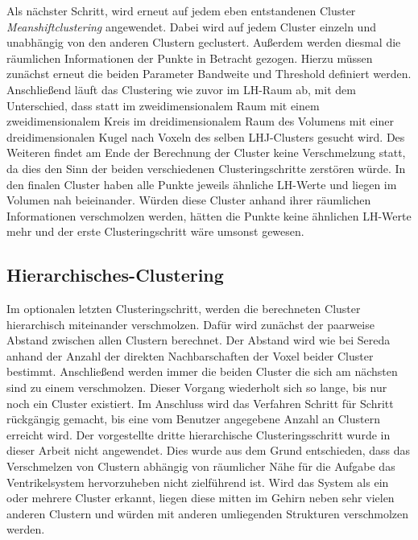 Als nächster Schritt, wird erneut auf jedem eben entstandenen Cluster \textit{Meanshiftclustering} angewendet. Dabei wird auf jedem Cluster einzeln und unabhängig von den anderen Clustern geclustert. Außerdem werden diesmal die räumlichen Informationen der Punkte in Betracht gezogen. Hierzu müssen zunächst erneut die beiden Parameter Bandweite und Threshold definiert werden.
\newline
Anschließend läuft das Clustering wie zuvor im LH-Raum ab, mit dem Unterschied, dass statt im zweidimensionalem Raum mit einem zweidimensionalem Kreis im dreidimensionalem Raum des Volumens mit einer dreidimensionalen Kugel nach Voxeln des selben LHJ-Clusters gesucht wird.
\newline
Des Weiteren findet am Ende der Berechnung der Cluster keine Verschmelzung statt, da dies den Sinn der beiden verschiedenen Clusteringschritte zerstören würde. In den finalen Cluster haben alle Punkte jeweils ähnliche LH-Werte und liegen im Volumen nah beieinander. Würden diese Cluster anhand ihrer räumlichen Informationen verschmolzen werden, hätten die Punkte keine ähnlichen LH-Werte mehr und der erste Clusteringschritt wäre umsonst gewesen.



\subsection{Hierarchisches-Clustering}
 
Im optionalen letzten Clusteringschritt, werden die berechneten Cluster hierarchisch miteinander verschmolzen. Dafür wird zunächst der paarweise Abstand zwischen allen Clustern berechnet. Der Abstand wird wie bei Sereda \cite{sereda2006automating} anhand der Anzahl der direkten Nachbarschaften der Voxel beider Cluster bestimmt. Anschließend werden immer die beiden Cluster die sich am nächsten sind zu einem verschmolzen. Dieser Vorgang wiederholt sich so lange, bis nur noch ein Cluster existiert. Im Anschluss wird das Verfahren Schritt für Schritt rückgängig gemacht, bis eine vom Benutzer angegebene Anzahl an Clustern erreicht wird.
\newline
Der vorgestellte dritte hierarchische Clusteringsschritt wurde in dieser Arbeit nicht angewendet. Dies wurde aus dem Grund entschieden, dass das Verschmelzen von Clustern abhängig von räumlicher Nähe für die Aufgabe das Ventrikelsystem hervorzuheben nicht zielführend ist. Wird das System als ein oder mehrere Cluster erkannt, liegen diese mitten im Gehirn neben sehr vielen anderen Clustern und würden mit anderen umliegenden Strukturen verschmolzen werden.

